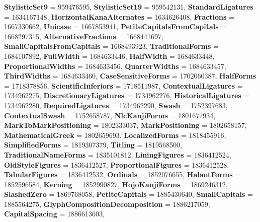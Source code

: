 \begin{DoxyCompactItemize}
\newline
{\bfseries Stylistic\+Set9} = 959476595, 
{\bfseries Stylistic\+Set19} = 959542131, 
{\bfseries Standard\+Ligatures} = 1634167148, 
{\bfseries Horizontal\+Kana\+Alternates} = 1634626408, 
\newline
{\bfseries Fractions} = 1667330662, 
{\bfseries Unicase} = 1667853941, 
{\bfseries Petite\+Capitals\+From\+Capitals} = 1668297315, 
{\bfseries Alternative\+Fractions} = 1668441697, 
\newline
{\bfseries Small\+Capitals\+From\+Capitals} = 1668493923, 
{\bfseries Traditional\+Forms} = 1684107892, 
{\bfseries Full\+Width} = 1684633446, 
{\bfseries Half\+Width} = 1684633448, 
\newline
{\bfseries Proportional\+Widths} = 1684633456, 
{\bfseries Quarter\+Widths} = 1684633457, 
{\bfseries Third\+Widths} = 1684633460, 
{\bfseries Case\+Sensitive\+Forms} = 1702060387, 
\newline
{\bfseries Half\+Forms} = 1718378856, 
{\bfseries Scientific\+Inferiors} = 1718511987, 
{\bfseries Contextual\+Ligatures} = 1734962275, 
{\bfseries Discretionary\+Ligatures} = 1734962276, 
\newline
{\bfseries Historical\+Ligatures} = 1734962280, 
{\bfseries Required\+Ligatures} = 1734962290, 
{\bfseries Swash} = 1752397683, 
{\bfseries Contextual\+Swash} = 1752658787, 
\newline
{\bfseries Nlc\+Kanji\+Forms} = 1801677934, 
{\bfseries Mark\+To\+Mark\+Positioning} = 1802333037, 
{\bfseries Mark\+Positioning} = 1802658157, 
{\bfseries Mathematical\+Greek} = 1802659693, 
\newline
{\bfseries Localized\+Forms} = 1818455916, 
{\bfseries Simplified\+Forms} = 1819307379, 
{\bfseries Titling} = 1819568500, 
{\bfseries Traditional\+Name\+Forms} = 1835101812, 
\newline
{\bfseries Lining\+Figures} = 1836412524, 
{\bfseries Old\+Style\+Figures} = 1836412527, 
{\bfseries Proportional\+Figures} = 1836412528, 
{\bfseries Tabular\+Figures} = 1836412532, 
\newline
{\bfseries Ordinals} = 1852076655, 
{\bfseries Halant\+Forms} = 1852596584, 
{\bfseries Kerning} = 1852990827, 
{\bfseries Hojo\+Kanji\+Forms} = 1869246312, 
\newline
{\bfseries Slashed\+Zero} = 1869768058, 
{\bfseries Petite\+Capitals} = 1885430640, 
{\bfseries Small\+Capitals} = 1885564275, 
{\bfseries Glyph\+Composition\+Decomposition} = 1886217059, 
\newline
{\bfseries Capital\+Spacing} = 1886613603, 

\end{DoxyCompactItemize}
